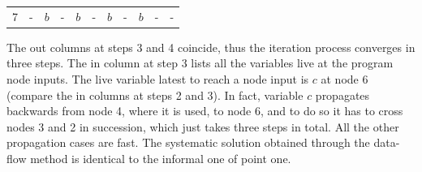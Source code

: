 \begin{enumerate}
\begin{table}[H]
\begin{tabular}{ccccccccccc}
            \multicolumn{1}{c|}{7}    & -         & \multicolumn{1}{c|}{$b$}        & -    & \multicolumn{1}{c|}{$b$}  & -    & \multicolumn{1}{c|}{$b$}  & -    & \multicolumn{1}{c|}{$b$}  & -               & -           
            \end{tabular}
        \end{table}
        The out columns at steps 3 and 4 coincide, thus the iteration process converges in three steps. The in column at step 3 lists all the variables
        live at the program node inputs. The live variable latest to reach a node input is $c$ at node 6 (compare the in columns at steps 2 and 3). In fact, 
        variable $c$ propagates backwards from node 4, where it is used, to node 6, and to do so it has to cross nodes 3 and 2 in succession, which just takes 
        three steps in total. All the other propagation cases are fast. The systematic solution obtained through the data-flow method is identical to the informal 
        one of point one. 
\end{enumerate}